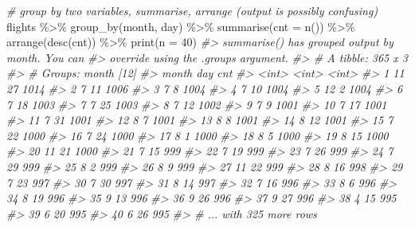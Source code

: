 \documentclass[
]{book}
\newenvironment{Shaded}{\begin{snugshade}}{\end{snugshade}}
\newcommand{\AttributeTok}[1]{\textcolor[rgb]{0.77,0.63,0.00}{#1}}
\newcommand{\CommentTok}[1]{\textcolor[rgb]{0.56,0.35,0.01}{\textit{#1}}}
\newcommand{\DecValTok}[1]{\textcolor[rgb]{0.00,0.00,0.81}{#1}}
\newcommand{\FunctionTok}[1]{\textcolor[rgb]{0.00,0.00,0.00}{#1}}
\newcommand{\NormalTok}[1]{#1}
\newcommand{\SpecialCharTok}[1]{\textcolor[rgb]{0.00,0.00,0.00}{#1}}
\begin{document}
\begin{Shaded}
\begin{Highlighting}[]
\CommentTok{\# group by two variables, summarise, arrange (output is possibly confusing)}
\NormalTok{flights }\SpecialCharTok{\%\textgreater{}\%} \FunctionTok{group\_by}\NormalTok{(month, day) }\SpecialCharTok{\%\textgreater{}\%} \FunctionTok{summarise}\NormalTok{(}\AttributeTok{cnt =} \FunctionTok{n}\NormalTok{()) }\SpecialCharTok{\%\textgreater{}\%} \FunctionTok{arrange}\NormalTok{(}\FunctionTok{desc}\NormalTok{(cnt)) }\SpecialCharTok{\%\textgreater{}\%} \FunctionTok{print}\NormalTok{(}\AttributeTok{n =} \DecValTok{40}\NormalTok{)}
\CommentTok{\#\textgreater{} \textasciigrave{}summarise()\textasciigrave{} has grouped output by \textquotesingle{}month\textquotesingle{}. You can}
\CommentTok{\#\textgreater{} override using the \textasciigrave{}.groups\textasciigrave{} argument.}
\CommentTok{\#\textgreater{} \# A tibble: 365 x 3}
\CommentTok{\#\textgreater{} \# Groups:   month [12]}
\CommentTok{\#\textgreater{}    month   day   cnt}
\CommentTok{\#\textgreater{}    \textless{}int\textgreater{} \textless{}int\textgreater{} \textless{}int\textgreater{}}
\CommentTok{\#\textgreater{}  1    11    27  1014}
\CommentTok{\#\textgreater{}  2     7    11  1006}
\CommentTok{\#\textgreater{}  3     7     8  1004}
\CommentTok{\#\textgreater{}  4     7    10  1004}
\CommentTok{\#\textgreater{}  5    12     2  1004}
\CommentTok{\#\textgreater{}  6     7    18  1003}
\CommentTok{\#\textgreater{}  7     7    25  1003}
\CommentTok{\#\textgreater{}  8     7    12  1002}
\CommentTok{\#\textgreater{}  9     7     9  1001}
\CommentTok{\#\textgreater{} 10     7    17  1001}
\CommentTok{\#\textgreater{} 11     7    31  1001}
\CommentTok{\#\textgreater{} 12     8     7  1001}
\CommentTok{\#\textgreater{} 13     8     8  1001}
\CommentTok{\#\textgreater{} 14     8    12  1001}
\CommentTok{\#\textgreater{} 15     7    22  1000}
\CommentTok{\#\textgreater{} 16     7    24  1000}
\CommentTok{\#\textgreater{} 17     8     1  1000}
\CommentTok{\#\textgreater{} 18     8     5  1000}
\CommentTok{\#\textgreater{} 19     8    15  1000}
\CommentTok{\#\textgreater{} 20    11    21  1000}
\CommentTok{\#\textgreater{} 21     7    15   999}
\CommentTok{\#\textgreater{} 22     7    19   999}
\CommentTok{\#\textgreater{} 23     7    26   999}
\CommentTok{\#\textgreater{} 24     7    29   999}
\CommentTok{\#\textgreater{} 25     8     2   999}
\CommentTok{\#\textgreater{} 26     8     9   999}
\CommentTok{\#\textgreater{} 27    11    22   999}
\CommentTok{\#\textgreater{} 28     8    16   998}
\CommentTok{\#\textgreater{} 29     7    23   997}
\CommentTok{\#\textgreater{} 30     7    30   997}
\CommentTok{\#\textgreater{} 31     8    14   997}
\CommentTok{\#\textgreater{} 32     7    16   996}
\CommentTok{\#\textgreater{} 33     8     6   996}
\CommentTok{\#\textgreater{} 34     8    19   996}
\CommentTok{\#\textgreater{} 35     9    13   996}
\CommentTok{\#\textgreater{} 36     9    26   996}
\CommentTok{\#\textgreater{} 37     9    27   996}
\CommentTok{\#\textgreater{} 38     4    15   995}
\CommentTok{\#\textgreater{} 39     6    20   995}
\CommentTok{\#\textgreater{} 40     6    26   995}
\CommentTok{\#\textgreater{} \# ... with 325 more rows}


\end{Highlighting}
\end{Shaded}
\end{document}
